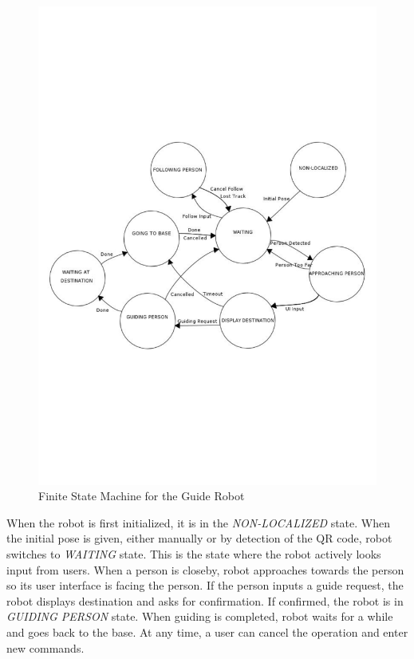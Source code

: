 \begin{figure}[ht!]
\centering
\includegraphics[width=1.0\textwidth]{pics/fsm}
\caption{Finite State Machine for the Guide Robot}
\label{fig:fsm}
\end{figure}

When the robot is first initialized, it is in the \textit{NON-LOCALIZED} state. When the initial pose is given, either manually or by detection of the QR code, robot switches to \textit{WAITING} state. This is the state where the robot actively looks input from users. When a person is closeby, robot approaches towards the person so its user interface is facing the person. If the person inputs a guide request, the robot displays destination and asks for confirmation. If confirmed, the robot is in \textit{GUIDING PERSON} state. When guiding is completed, robot waits for a while and goes back to the base. At any time, a user can cancel the operation and enter new commands.

